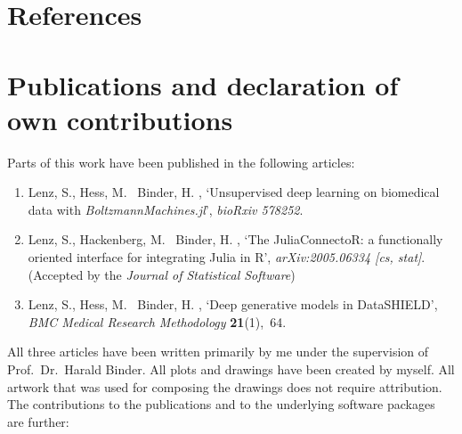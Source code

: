 \documentclass[12pt]{article}
\newcommand{\apkg}[1]{\emph{#1}}
\begin{document}
\begin{appendices}
\singlespacing
\section{References}

\renewcommand{\bibsection}{} %



\clearpage
\onehalfspacing
\section[Publications and declaration of own contributions]{Publications and declaration of \\ own contributions}
Parts of this work have been published in the following articles:

\begin{enumerate}[(1)]
\item
Lenz, S., Hess, M. \harvardand\ Binder, H.  \harvardyearright , `Unsupervised deep learning on biomedical data with \apkg{BoltzmannMachines.jl}', {\em bioRxiv 578252}.
\newline{}

\item 
Lenz, S., Hackenberg, M. \harvardand\ Binder, H.  \harvardyearright , `The {JuliaConnectoR}: a functionally oriented
  interface for integrating {Julia} in {R}', {\em arXiv:2005.06334 [cs, stat]}. 
  \newline(Accepted by the {\em Journal of Statistical Software})
\newline{}

\item
Lenz, S., Hess, M. \harvardand\ Binder, H.  \harvardyearright , `Deep generative models in {DataSHIELD}', {\em BMC
  Medical Research Methodology} {\bf 21}(1),~64.
\newline{}
\end{enumerate}

All three articles have been written primarily by me under the supervision of Prof.~Dr.~Harald Binder. 
All plots and drawings have been created by myself.
All artwork that was used for composing the drawings does not require attribution.
The contributions to the publications and to the underlying software packages are further:


\end{appendices}
\end{document}
